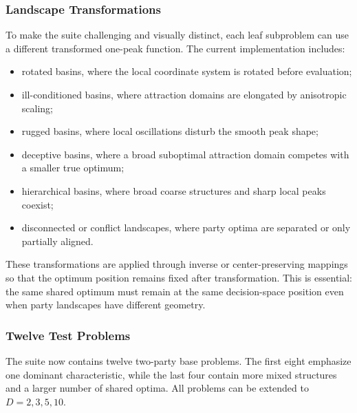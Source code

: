 \documentclass[12pt,a4paper]{article}
\begin{document}
\subsubsection{Landscape Transformations}

To make the suite challenging and visually distinct, each leaf subproblem can use a
different transformed one-peak function. The current implementation includes:
\begin{itemize}[leftmargin=2em]
  \item rotated basins, where the local coordinate system is rotated before evaluation;
  \item ill-conditioned basins, where attraction domains are elongated by anisotropic scaling;
  \item rugged basins, where local oscillations disturb the smooth peak shape;
  \item deceptive basins, where a broad suboptimal attraction domain competes with a
        smaller true optimum;
  \item hierarchical basins, where broad coarse structures and sharp local peaks coexist;
  \item disconnected or conflict landscapes, where party optima are separated or only
        partially aligned.
\end{itemize}
These transformations are applied through inverse or center-preserving mappings so that
the optimum position remains fixed after transformation. This is essential: the same
shared optimum must remain at the same decision-space position even when party
landscapes have different geometry.

\subsubsection{Twelve Test Problems}

The suite now contains twelve two-party base problems. The first eight emphasize one
dominant characteristic, while the last four contain more mixed structures and a larger
number of shared optima. All problems can be extended to $D=2,3,5,10$.
\end{document}
